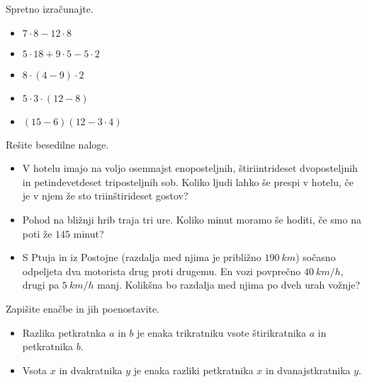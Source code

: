                    \begin{naloga}
                        Spretno izračunajte.
                        \begin{itemize}
                            \item $7\cdot 8-12\cdot 8$  
                            \item $5\cdot 18+9\cdot 5-5\cdot 2$  
                            \item $8\cdot(4-9)\cdot 2$  
                            \item $5\cdot 3\cdot (12-8)$  
                            \item $(15-6)(12-3\cdot 4)$  
                        \end{itemize}
                    \end{naloga}
                
                    \begin{naloga}
                        Rešite besedilne naloge.
                        \begin{itemize}
                            \item V hotelu imajo na voljo osemnajst enoposteljnih, štiriintrideset dvoposteljnih in petindevetdeset triposteljnih sob.
                                Koliko ljudi lahko še prespi v hotelu, če je v njem že sto triinštirideset gostov?      
                            \item Pohod na bližnji hrib traja tri ure. Koliko minut moramo še hoditi, če smo na poti že $145$ minut?       
                            \item S Ptuja in iz Postojne (razdalja med njima je približno $190~km$) sočasno odpeljeta dva motorista drug proti drugemu.
                                En vozi povprečno $40~km/h$, drugi pa $5~km/h$ manj. Kolikšna bo razdalja med njima po dveh urah vožnje?      
                        \end{itemize}
                    \end{naloga}
        
                    \begin{naloga}
                        Zapišite enačbe in jih poenostavite.
                        \begin{itemize}
                            \item Razlika petkratnka $a$ in $b$ je enaka trikratniku vsote štirikratnika $a$ in petkratnika $b$.   
                            \item Vsota $x$ in dvakratnika $y$ je enaka razliki petkratnika $x$ in dvanajstkratnika $y$.    
                        \end{itemize}
                    \end{naloga}


